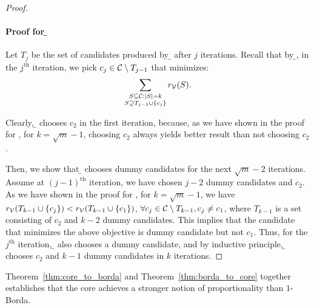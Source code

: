 \begin{proof}
\paragraph{Proof for \b{}}
Let $T_j$ be the set of candidates produced by \b{} after $j$ iterations. Recall that by \b{}, in the $j^{\text{th}}$ iteration, we pick $c_j \in \mathcal{C} \setminus T_{j - 1}$ that minimizes:
\[
\sum_{\substack{S \subseteq \mathcal{C}: |S| = k \\ S \supseteq T_{j - 1} \cup \{c_j\}}} r_{\mathcal{V}}(S).
\]

Clearly, \b{} chooses $c_2$ in the first iteration, because, as we have shown in the proof for \opt{}, for $k = \sqrt{m} - 1$, choosing $c_2$ always yields better result than not choosing $c_2$. 

Then, we show that \b{} chooses dummy candidates for the next $\sqrt{m} - 2$ iterations. Assume at $(j - 1)^{\text{th}}$ iteration, we have chosen $j - 2$ dummy candidates and $c_2$. As we have shown in the proof for \opt{}, for $k = \sqrt{m} - 1$, we have $r_{\mathcal{V}}(T_{k - 1} \cup \{c_j\}) < r_{\mathcal{V}}(T_{k - 1} \cup \{c_1\})$, $\forall c_j \in \mathcal{C} \setminus T_{k - 1}, c_j \neq c_1$, where $T_{k - 1}$ is a set consisting of $c_2$ and $k - 2$ dummy candidates. This implies that the candidate that minimizes the above objective is dummy candidate but not $c_1$. Thus, for the $j^{\text{th}}$ iteration, \b{} also chooses a dummy candidate, and by inductive principle, \b{} chooses $c_2$ and $k - 1$ dummy candidates in $k$ iterations.
\end{proof}

Theorem~\ref{thm:core_to_borda} and Theorem~\ref{thm:borda_to_core} together establishes that the core achieves a stronger notion of proportionality than $1$-Borda.

